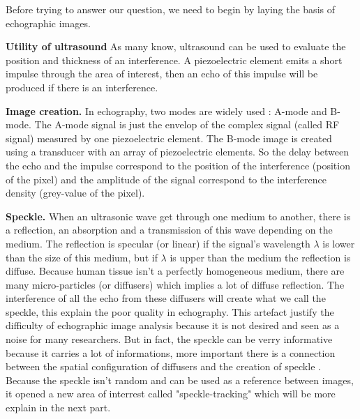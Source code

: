 \documentclass[runningheads,a4paper]{llncs}
\begin{document}
Before trying to answer our question, we need to begin by laying the basis of echographic images.\par
\textbf{Utility of ultrasound} As many know, ultrasound can be used to evaluate the position and thickness of an interference. A piezoelectric element emits a short impulse through the area of interest, then an echo of this impulse will be produced if there is an interference.\par
\textbf{Image creation.} In echography, two modes are widely used : A-mode and B-mode. 
The A-mode signal is just the envelop of the complex signal (called RF signal) measured by one piezoelectric element. 
The B-mode image is created using a transducer with an array of piezoelectric elements. So the delay between the echo and the impulse correspond to the position of the interference (position of the pixel) and the amplitude of the signal correspond to the interference density (grey-value of the pixel).\par
\textbf{Speckle.} When an ultrasonic wave get through one medium to another, there is a reflection, an absorption and a transmission of this wave depending on the medium. 
The reflection is specular (or linear) if the signal's wavelength $\lambda$ is lower than the size of this medium, but if $\lambda$ is upper than the medium the reflection is diffuse. 
Because human tissue isn't a perfectly homogeneous medium, there are many micro-particles (or diffusers) which implies a lot of diffuse reflection. The interference of all the echo from these diffusers will create what we call the speckle, this explain the poor quality in echography. 
This artefact justify the difficulty of echographic image analysis because it is not desired and seen as a noise for many researchers. But in fact, the speckle can be verry informative because it carries a lot of informations, more important there is a connection between the spatial configuration of diffusers and the creation of speckle \cite{wagner1983statistics}. 
Because the speckle isn't random and can be used as a reference between images, it opened a new area of interrest called "speckle-tracking" which will be more explain in the next part.
\end{document}
